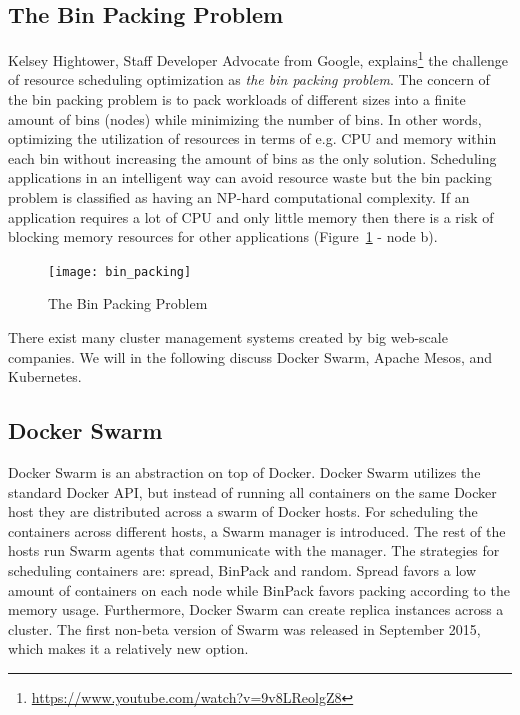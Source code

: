 \subsection*{The Bin Packing Problem}
Kelsey Hightower, Staff Developer Advocate from Google, explains\footnote{\url{https://www.youtube.com/watch?v=9v8LReolgZ8}} the challenge of resource scheduling optimization as \textit{the bin packing problem}. The concern of the bin packing problem is to pack workloads of different sizes into a finite amount of bins (nodes) while minimizing the number of bins. In other words, optimizing the utilization of resources in terms of e.g. CPU and memory within each bin without increasing the amount of bins as the only solution. Scheduling applications in an intelligent way can avoid resource waste but the bin packing problem is classified as having an NP-hard computational complexity. If an application requires a lot of CPU and only little memory then there is a risk of blocking memory resources for other applications (Figure~\ref{fig:bin_packing} - node b).

\begin{figure}[H]
    \centering
    \texttt{[image: bin\_packing]}
    \caption{The Bin Packing Problem}
    \label{fig:bin_packing}
\end{figure}

\noindent There exist many cluster management systems created by big web-scale companies. We will in the following discuss Docker Swarm, Apache Mesos, and Kubernetes.

\subsection*{Docker Swarm}
Docker Swarm is an abstraction on top of Docker. Docker Swarm utilizes the standard Docker API, but instead of running all containers on the same Docker host they are distributed across a swarm of Docker hosts. For scheduling the containers across different hosts, a Swarm manager is introduced. The rest of the hosts run Swarm agents that communicate with the manager. The strategies for scheduling containers are: spread, BinPack and random. Spread favors a low amount of containers on each node while BinPack favors packing according to the memory usage. Furthermore, Docker Swarm can create replica instances across a cluster. The first non-beta version of Swarm was released in September 2015, which makes it a relatively new option.

